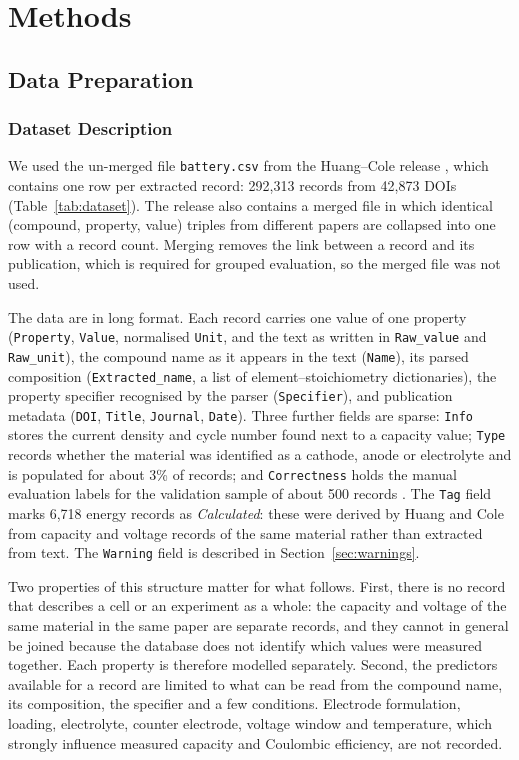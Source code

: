 \documentclass[journal=jcisd8,manuscript=article,layout=traditional]{achemso}
\begin{document}
\section{Methods}

\subsection{Data Preparation}

\subsubsection{Dataset Description}
\label{sec:data}

We used the un-merged file \texttt{battery.csv} from the Huang--Cole release \cite{huang2020figshare}, which contains one row per extracted record: 292,313 records from 42,873 DOIs (Table~\ref{tab:dataset}). The release also contains a merged file in which identical (compound, property, value) triples from different papers are collapsed into one row with a record count. Merging removes the link between a record and its publication, which is required for grouped evaluation, so the merged file was not used.

The data are in long format. Each record carries one value of one property (\texttt{Property}, \texttt{Value}, normalised \texttt{Unit}, and the text as written in \texttt{Raw\_value} and \texttt{Raw\_unit}), the compound name as it appears in the text (\texttt{Name}), its parsed composition (\texttt{Extracted\_name}, a list of element--stoichiometry dictionaries), the property specifier recognised by the parser (\texttt{Specifier}), and publication metadata (\texttt{DOI}, \texttt{Title}, \texttt{Journal}, \texttt{Date}). Three further fields are sparse: \texttt{Info} stores the current density and cycle number found next to a capacity value; \texttt{Type} records whether the material was identified as a cathode, anode or electrolyte and is populated for about 3\% of records; and \texttt{Correctness} holds the manual evaluation labels for the validation sample of about 500 records \cite{huang2020database}. The \texttt{Tag} field marks 6,718 energy records as \emph{Calculated}: these were derived by Huang and Cole from capacity and voltage records of the same material rather than extracted from text. The \texttt{Warning} field is described in Section~\ref{sec:warnings}.

Two properties of this structure matter for what follows. First, there is no record that describes a cell or an experiment as a whole: the capacity and voltage of the same material in the same paper are separate records, and they cannot in general be joined because the database does not identify which values were measured together. Each property is therefore modelled separately. Second, the predictors available for a record are limited to what can be read from the compound name, its composition, the specifier and a few conditions. Electrode formulation, loading, electrolyte, counter electrode, voltage window and temperature, which strongly influence measured capacity and Coulombic efficiency, are not recorded.
\end{document}
